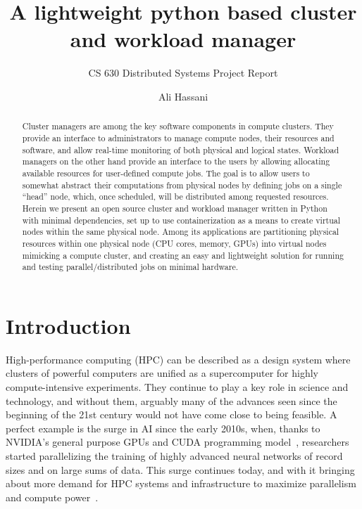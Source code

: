 \documentclass[sigconf]{acmart}
\begin{document}
\title{A lightweight python based cluster and workload manager}

\subtitle{CS 630 Distributed Systems Project Report}

\author{Ali Hassani}

\renewcommand{\shortauthors}{Hassani}

\begin{abstract}
    Cluster managers are among the key software components in compute clusters.
    They provide an interface to administrators to manage compute nodes, their resources and software, and allow real-time
    monitoring of both physical and logical states. Workload managers on the other hand provide an interface to the users by
    allowing allocating available resources for user-defined compute jobs.
    The goal is to allow users to somewhat abstract their computations from physical nodes by defining jobs on a single ``head''
    node, which, once scheduled, will be distributed among requested resources.
    Herein we present an open source cluster and workload manager written in Python with minimal dependencies, set up to use
    containerization as a means to create virtual nodes within the same physical node.
    Among its applications are partitioning physical resources within one physical node (CPU cores, memory, GPUs) into virtual
    nodes mimicking a compute cluster, and creating an easy and lightweight solution for running and testing 
    parallel/distributed jobs on minimal hardware.
\end{abstract}

\maketitle

\section{Introduction}

High-performance computing (HPC) can be described as a design system where clusters of powerful computers are unified as a
supercomputer for highly compute-intensive experiments.
They continue to play a key role in science and technology, and without them, arguably many of the advances seen since the
beginning of the 21st century would not have come close to being feasible.
A perfect example is the surge in AI since the early 2010s, when, thanks to NVIDIA's general purpose GPUs and CUDA programming 
model~\cite{kirk2007nvidia}, researchers started parallelizing the training of highly advanced neural networks of record sizes
and on large sums of data. This surge continues today, and with it bringing about more demand for HPC systems and
infrastructure to maximize parallelism and compute power~\cite{klenk2017relaxations}.
\end{document}
